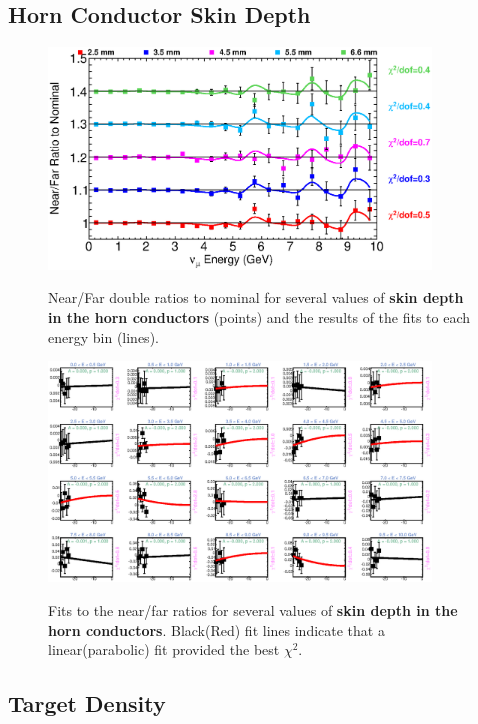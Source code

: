 \clearpage
\subsection{Horn Conductor Skin Depth}

\begin{figure}[ht]
  \begin{center}
    {\includegraphics[width=4.0in]{figures/SkinDepthIC__nof_summary.eps}}
  \end{center}
\caption{ Near/Far double ratios to nominal for several values of {\bf skin depth in the horn conductors} (points) and the results of the fits to each energy bin (lines).}
\end{figure}

\begin{figure}[hb]
  \begin{center}
    {\includegraphics[width=4.0in]{figures/SkinDepthIC__nof_fits.eps}}
  \end{center}
\caption{ Fits to the near/far ratios for several values of {\bf skin depth in the horn conductors}. Black(Red) fit lines indicate that a linear(parabolic) fit provided the best $\chi^2$. }
\end{figure}

\clearpage
\subsection{Target Density}

